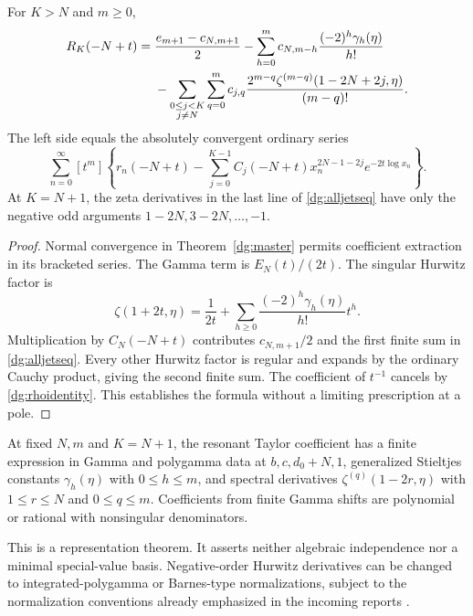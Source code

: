 \begin{theorem}\label{dg:alljets}
For $K>N$ and $m\ge0$,
\begin{align}
 [t^m]R_K(-N+t)
 ={}&\frac{e_{m+1}-c_{N,m+1}}2
 -\sum_{h=0}^{m}c_{N,m-h}\frac{(-2)^h\gamma_h(\eta)}{h!}
 \notag\\
 &-\sum_{\substack{0\le j<K\\j\ne N}}\sum_{q=0}^{m}
 c_{j,q}\frac{2^{m-q}\zeta^{(m-q)}(1-2N+2j,\eta)}{(m-q)!}.
 \label{dg:alljetseq}
\end{align}
The left side equals the absolutely convergent ordinary series
\begin{equation}\label{dg:jetseries}
 \sum_{n=0}^{\infty}[t^m]\left\{r_n(-N+t)
 -\sum_{j=0}^{K-1}C_j(-N+t)x_n^{2N-1-2j}e^{-2t\log x_n}\right\}.
\end{equation}
At $K=N+1$, the zeta derivatives in the last line of
\eqref{dg:alljetseq} have only the negative odd arguments
$1-2N,3-2N,\ldots,-1$.
\end{theorem}
\begin{proof}
Normal convergence in Theorem~\ref{dg:master} permits coefficient
extraction in its bracketed series. The Gamma term is $E_N(t)/(2t)$.
The singular Hurwitz factor is
\[
 \zeta(1+2t,\eta)=\frac1{2t}
          +\sum_{h\ge0}\frac{(-2)^h\gamma_h(\eta)}{h!}t^h.
\]
Multiplication by $C_N(-N+t)$ contributes
$c_{N,m+1}/2$ and the first finite sum in \eqref{dg:alljetseq}.
Every other Hurwitz factor is regular and expands by the ordinary
Cauchy product, giving the second finite sum. The coefficient of
$t^{-1}$ cancels by \eqref{dg:rhoidentity}. This establishes the
formula without a limiting prescription at a pole.
\end{proof}

\begin{corollary}\label{dg:closure}
At fixed $N,m$ and $K=N+1$, the resonant Taylor coefficient has a
finite expression in Gamma and polygamma data at $b,c,d_0+N,1$,
generalized Stieltjes constants $\gamma_h(\eta)$ with $0\le h\le m$,
and spectral derivatives $\zeta^{(q)}(1-2r,\eta)$ with
$1\le r\le N$ and $0\le q\le m$. Coefficients from finite Gamma
shifts are polynomial or rational with nonsingular denominators.
\end{corollary}
This is a representation theorem. It asserts neither algebraic
independence nor a minimal special-value basis. Negative-order
Hurwitz derivatives can be changed to integrated-polygamma or
Barnes-type normalizations, subject to the normalization conventions
already emphasized in the incoming reports \cite{incoming-gh,incoming-sh}.

